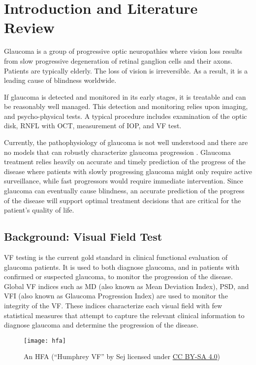 \chapter{Introduction and Literature Review}

Glaucoma is a group of progressive optic neuropathies where vision loss results from slow progressive degeneration of retinal ganglion cells and their axons. \cite{Weinreb2004} Patients are typically elderly. The loss of vision is irreversible. As a result, it is a leading cause of blindness worldwide. 

If glaucoma is detected and monitored in its early stages, it is treatable and can be reasonably well managed. This detection and monitoring relies upon imaging, and psycho-physical tests. A typical procedure includes examination of the optic disk, \ac{RNFL} with \ac{OCT}, measurement of \ac{IOP}, and \ac{VF} test.

Currently, the pathophysiology of glaucoma is not well understood and there are no models that can robustly characterize glaucoma progression \cite{Chen2014}. Glaucoma treatment relies heavily on accurate and timely prediction of the progress of the disease where patients with slowly progressing glaucoma might only require active surveillance, while fast progressors would require immediate intervention. Since glaucoma can eventually cause blindness, an accurate prediction of the progress of the disease will support optimal treatment decisions that are critical for the patient’s quality of life.  

\section{Background: Visual Field Test}

\ac{VF} testing is the current gold standard in clinical functional evaluation of glaucoma patients. It is used to both diagnose glaucoma, and in patients with confirmed or suspected glaucoma, to monitor the progression of the disease. Global VF indices such as \ac{MD} (also known as Mean Deviation Index), \ac{PSD}, and \ac{VFI} (also known as Glaucoma Progression Index) are used to monitor the integrity of the VF. These indices characterize each visual field with few statistical measures that attempt to capture the relevant clinical information to diagnose glaucoma and determine the progression of the disease. 

\begin{figure}[t]
	\centering
	\texttt{[image: hfa]}
	\caption{An \ac{HFA} (``Humphrey VF'' by Sej licensed under \href{https://creativecommons.org/licenses/by-sa/4.0/deed.en}{CC BY-SA 4.0})}
	\label{fig:hfa}
\end{figure} 

